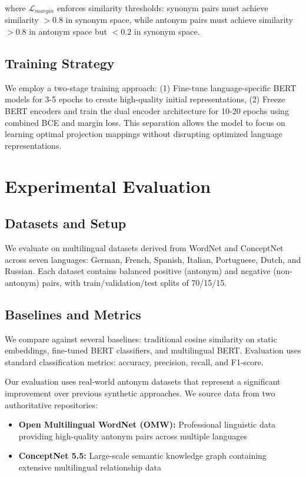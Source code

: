 \documentclass[11pt]{article}
\begin{document}
where $\mathcal{L}_{margin}$ enforces similarity thresholds: synonym pairs must achieve similarity $> 0.8$ in synonym space, while antonym pairs must achieve similarity $> 0.8$ in antonym space but $< 0.2$ in synonym space.

\subsection{Training Strategy}
We employ a two-stage training approach: (1) Fine-tune language-specific BERT models for 3-5 epochs to create high-quality initial representations, (2) Freeze BERT encoders and train the dual encoder architecture for 10-20 epochs using combined BCE and margin loss. This separation allows the model to focus on learning optimal projection mappings without disrupting optimized language representations.

\section{Experimental Evaluation}

\subsection{Datasets and Setup}
We evaluate on multilingual datasets derived from WordNet and ConceptNet across seven languages: German, French, Spanish, Italian, Portuguese, Dutch, and Russian. Each dataset contains balanced positive (antonym) and negative (non-antonym) pairs, with train/validation/test splits of 70/15/15.

\subsection{Baselines and Metrics}
We compare against several baselines: traditional cosine similarity on static embeddings, fine-tuned BERT classifiers, and multilingual BERT. Evaluation uses standard classification metrics: accuracy, precision, recall, and F1-score.

Our evaluation uses real-world antonym datasets that represent a significant improvement over previous synthetic approaches. We source data from two authoritative repositories:

\begin{itemize}
\item \textbf{Open Multilingual WordNet (OMW):} Professional linguistic data providing high-quality antonym pairs across multiple languages
\item \textbf{ConceptNet 5.5:} Large-scale semantic knowledge graph containing extensive multilingual relationship data \cite{speer2017conceptnet}
\end{itemize}
\end{document}
